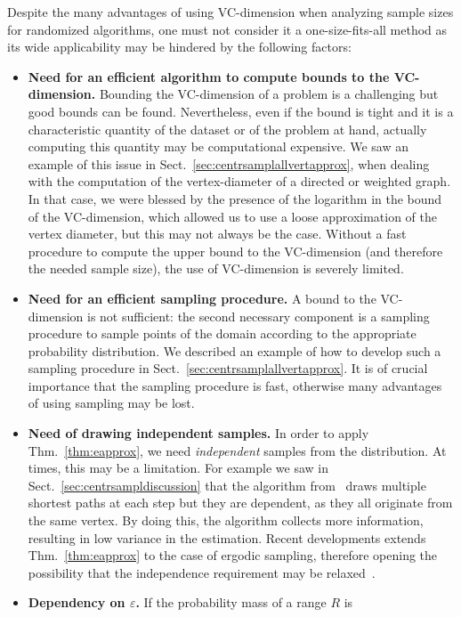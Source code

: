 Despite the many advantages of using VC-dimension when analyzing sample sizes
for randomized algorithms, one must not consider it a one-size-fits-all method
as its wide applicability may be hindered by the following factors:
\begin{itemize}
  \item{\bf Need for an efficient algorithm to compute bounds to the
    VC-dimension.} Bounding the VC-dimension of a problem is a challenging but
    good bounds can be found. Nevertheless, even if the bound is tight and it is a
    characteristic quantity of the dataset or of the problem at hand, actually
    computing this quantity may be computational expensive. We saw an example of
    this issue in Sect.~\ref{sec:centrsamplallvertapprox}, when dealing with the
    computation of the vertex-diameter of a directed or weighted graph. In that
    case, we were blessed by the presence of the logarithm in the bound of the
    VC-dimension, which allowed us to use a loose approximation of the vertex
    diameter, but this may not always be the case. Without a fast procedure to
    compute the upper bound to the VC-dimension (and therefore the needed sample
    size), the use of VC-dimension is severely limited.
  \item{\bf Need for an efficient sampling procedure.} A bound to the
    VC-dimension is not sufficient: the second necessary component is a sampling
    procedure to sample points of the domain according to the appropriate
    probability distribution. We described an example of how to develop such a
    sampling procedure in Sect.~\ref{sec:centrsamplallvertapprox}. It is of
    crucial importance that the sampling procedure is fast, otherwise many
    advantages of using sampling may be lost.
  \item{\bf Need of drawing independent samples.} In order to apply
    Thm.~\ref{thm:eapprox}, we need \emph{independent} samples from the
    distribution. At times, this may be a limitation. For example we saw in
    Sect.~\ref{sec:centrsampldiscussion} that the algorithm
    from~\citep{BrandesP07} draws multiple shortest paths at each step but they
    are dependent, as they all originate from the same vertex. By doing this,
    the algorithm collects more information, resulting in low variance in the
    estimation. Recent developments extends Thm.~\ref{thm:eapprox} to the case
    of ergodic sampling, therefore opening the possibility that the independence
    requirement may be relaxed~\citep{Catoni04,AdamsN11,AdamsN13,VanHandel13}.
  \item{\bf Dependency on $\varepsilon$.} If the probability mass of a range $R$ is

\end{itemize}

